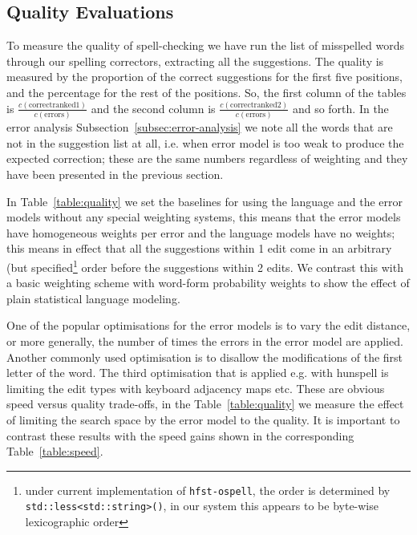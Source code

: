 \documentclass[a4paper,12pt]{article}
\begin{document}
\subsection{Quality Evaluations}

To measure the quality of spell-checking we have run the list of misspelled
words through our spelling correctors, extracting all the suggestions.  The
quality is measured by the proportion of the correct suggestions for the first
five positions, and the percentage for the rest of the positions. So, the first
column of the tables is $\frac{c(\mathrm{correct ranked
1})}{c(\mathrm{errors})}$ and the second column is $\frac{c(\mathrm{correct
ranked 2})}{c(\mathrm{errors})}$ and so forth.  In the error analysis
Subsection~\ref{subsec:error-analysis} we note all the words that are not in
the suggestion list at all, i.e. when error model is too weak to produce the
expected correction; these are the same numbers regardless of weighting and
they have been presented in the previous section.

In Table~\ref{table:quality} we set the baselines for using the language and
the error models without any special weighting systems, this means that the
error models have homogeneous weights per error and the language models have no
weights; this means in effect that all the suggestions within 1 edit come in an
arbitrary (but specified\footnote{under current implementation of
    \texttt{hfst-ospell}, the order is determined by
    \texttt{std::less<std::string>()}, in our system this appears to be
byte-wise lexicographic order} order before the suggestions within 2 edits.  We
contrast this with a basic weighting scheme with word-form probability weights
to show the effect of plain statistical language modeling.

One of the popular optimisations for the error models is to vary the edit
distance, or more generally, the number of times the errors in the error model
are applied.  Another commonly used optimisation is to disallow the
modifications of the first letter of the word. The third optimisation that is
applied e.g.  with hunspell is limiting the edit types with keyboard adjacency
maps etc.  These are obvious speed versus quality trade-offs, in the
Table~\ref{table:quality} we measure the effect of limiting the search space by
the error model to the quality. It is important to contrast these results with
the speed gains shown in the corresponding Table~\ref{table:speed}.
\end{document}
